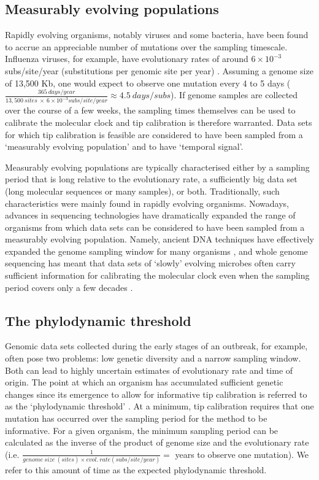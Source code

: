\documentclass[11pt]{article}
\begin{document}
\subsection{Measurably evolving populations}
Rapidly evolving organisms, notably viruses and some bacteria, have been found to accrue an appreciable number of mutations over the sampling timescale. Influenza viruses, for example, have evolutionary rates of around $6\times10^{-3}$ subs/site/year (substitutions per genomic site per year) \citep{ghafari2022purifying, sanjuan2012molecular}. Assuming a genome size of 13,500 Kb, one would expect to observe one mutation every 4 to 5 days ($\frac{365\ days/year}{13,500\ sites\ \times\ 6\times10^{-3}subs/site/year}\approx4.5\ days/subs$). If genome samples are collected over the course of a few weeks, the sampling times themselves can be used to calibrate the molecular clock and tip calibration is therefore warranted. Data sets for which tip calibration is feasible are considered to have been sampled from a `measurably evolving population' \citep{drummond2003measurably} and to have `temporal signal'. 

Measurably evolving populations are typically characterised either by a sampling period that is long relative to the evolutionary rate, a sufficiently big data set (long molecular sequences or many samples), or both. Traditionally, such characteristics were mainly found in rapidly evolving organisms. Nowadays, advances in sequencing technologies have dramatically expanded the range of organisms from which data sets can be considered to have been sampled from a measurably evolving population. Namely, ancient DNA techniques have effectively expanded the genome sampling window for many organisms \citep{spyrou2019ancient, duchene2020recovery}, and whole genome sequencing has meant that data sets of `slowly' evolving microbes often carry sufficient information for calibrating the molecular clock  \citep{biek2015measurably} even when the sampling period covers only a few decades \citep{menardo2019molecular}.

\subsection{The phylodynamic threshold}
Genomic data sets collected during the early stages of an outbreak, for example, often pose two problems: low genetic diversity and a narrow sampling window. Both can lead to highly uncertain estimates of evolutionary rate and time of origin. The point at which an organism has accumulated sufficient genetic changes since its emergence to allow for informative tip calibration is referred to as the ‘phylodynamic threshold’ \citep{duchene2020temporal}. At a minimum, tip calibration requires that one mutation has occurred over the sampling period for the method to be informative. For a given organism, the minimum sampling period can be calculated as the inverse of the product of genome size and the evolutionary rate (i.e. $\frac{1}{genome\ size\ (sites) \times evol.\ rate (subs/site/year)}=$ years to observe one mutation). We refer to this amount of time as the expected phylodynamic threshold. 
\end{document}
